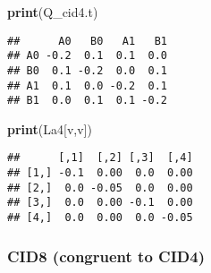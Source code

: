 \documentclass[
]{article}
\newenvironment{Shaded}{\begin{snugshade}}{\end{snugshade}}
\newcommand{\FunctionTok}[1]{\textcolor[rgb]{0.13,0.29,0.53}{\textbf{#1}}}
\newcommand{\NormalTok}[1]{#1}
\begin{document}
\begin{Shaded}
\begin{Highlighting}[]
\FunctionTok{print}\NormalTok{(Q\_cid4.t)}
\end{Highlighting}
\end{Shaded}

\begin{verbatim}
##      A0   B0   A1   B1
## A0 -0.2  0.1  0.1  0.0
## B0  0.1 -0.2  0.0  0.1
## A1  0.1  0.0 -0.2  0.1
## B1  0.0  0.1  0.1 -0.2
\end{verbatim}

\begin{Shaded}
\begin{Highlighting}[]
\FunctionTok{print}\NormalTok{(La4[v,v])}
\end{Highlighting}
\end{Shaded}

\begin{verbatim}
##      [,1]  [,2] [,3]  [,4]
## [1,] -0.1  0.00  0.0  0.00
## [2,]  0.0 -0.05  0.0  0.00
## [3,]  0.0  0.00 -0.1  0.00
## [4,]  0.0  0.00  0.0 -0.05
\end{verbatim}

\hypertarget{cid8-congruent-to-cid4}{%
\subsubsection{CID8 (congruent to CID4)}\label{cid8-congruent-to-cid4}}
\end{document}
